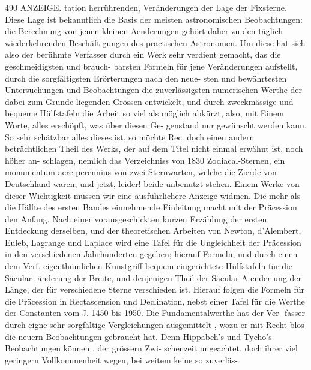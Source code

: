 \documentclass[10pt,a4paper]{article}
\begin{document}
490  ANZEIGE.
tation  herrührenden,  Veränderungen  der  Lage  der  Fixsterne.  Diese  Lage  ist  bekanntlich  die  Basis  der
meisten  astronomischen  Beobachtungen:  die  Berechnung  von  jenen  kleinen  Aenderungen  gehört  daher
zu  den  täglich  wiederkehrenden  Beschäftigungen  des  practischen  Astronomen.  Um  diese  hat  sich  also
der  berühmte  Verfasser  durch  ein  Werk  sehr  verdient  gemacht,  das  die  geschmeidigsten  und  brauch-
barsten Formeln  für  jene  Veränderungen  aufstellt,  durch  die  sorgfältigsten  Erörterungen  nach  den  neue-
sten und  bewährtesten  Untersuchungen  und  Beobachtungen  die  zuverlässigsten  numerischen  Werthe  der
dabei  zum  Grunde  liegenden  Grössen  entwickelt,  und  durch  zweckmässige  und  bequeme  Hülfstafeln
die  Arbeit  so  viel  als  möglich  abkürzt,  also,  mit  Einem  Worte,  alles  erschöpft,  was  über  diesen  Ge-
genstand nur  gewünscht  werden  kann.  So  sehr  schätzbar  alles  dieses  ist,  so  möchte  Rec.  doch  einen
andern  beträchtlichen  Theil  des  Werks,  der  auf  dem  Titel  nicht  einmal  erwähnt  ist,  noch  höher  an-
schlagen, nemlich  das  Verzeichniss  von  1830  Zodiacal-Sternen,  ein  monumentum  aere  perennius  von  zwei
Sternwarten,  welche  die  Zierde  von  Deutschland  waren,  und  jetzt,  leider!  beide  unbenutzt  stehen.
Einem  Werke  von  dieser  Wichtigkeit  müssen  wir  eine  ausführlichere  Anzeige  widmen.
Die  mehr  als  die  Hälfte  des  ersten  Bandes  einnehmende  Einleitung  macht  mit  der  Präcession
den  Anfang.  Nach  einer  vorausgeschickten  kurzen  Erzählung  der  ersten  Entdeckung  derselben,  und
der  theoretischen  Arbeiten  von  Newton,  d'Alembert,  Euleb,  Lagrange  und  Laplace  wird  eine  Tafel  für
die  Ungleichheit  der  Präcession  in  den  verschiedenen  Jahrhunderten  gegeben;  hierauf  Formeln,  und
durch  einen  dem  Verf.  eigenthümlichen  Kunstgriff  bequem  eingerichtete  Hülfstafeln  für  die  Säcular-
änderung  der  Breite,  und  denjenigen  Theil  der  Säcular-A ender ung  der  Länge,  der  für  verschiedene  Sterne
verschieden  ist.  Hierauf  folgen  die  Formeln  für  die  Präcession  in  Rectascension  und  Declination,  nebst
einer  Tafel  für  die  Werthe  der  Constanten  vom  J.  1450  bis  1950.  Die  Fundamentalwerthe  hat  der  Ver-
fasser durch  eigne  sehr  sorgfältige  Vergleichungen  ausgemittelt ,  wozu  er  mit  Recht  blos  die  neuern
Beobachtungen  gebraucht  hat.  Denn  Hippabch's  und  Tycho's  Beobachtungen  können ,  der  grössern  Zwi-
schenzeit ungeachtet,  doch  ihrer  viel  geringern  Vollkommenheit  wegen,  bei  weitem  keine  so  zuverläs-
\end{document}
